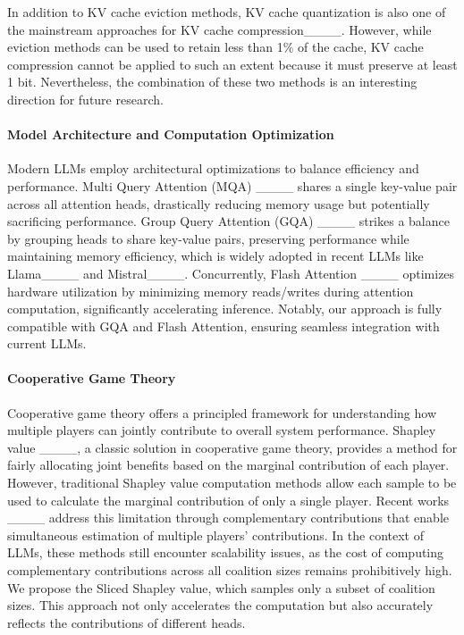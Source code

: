 In addition to KV cache eviction methods, KV cache quantization is also one of the mainstream approaches for KV cache compression____. However, while eviction methods can be used to retain less than 1\% of the cache, KV cache compression cannot be applied to such an extent because it must preserve at least 1 bit. Nevertheless, the combination of these two methods is an interesting direction for future research.

\paragraph{Model Architecture and Computation Optimization}
Modern LLMs employ architectural optimizations to balance efficiency and performance. Multi Query Attention (MQA) ____ shares a single key-value pair across all attention heads, drastically reducing memory usage but potentially sacrificing performance. Group Query Attention (GQA) ____ strikes a balance by grouping heads to share key-value pairs, preserving performance while maintaining memory efficiency, which is widely adopted in recent LLMs like Llama____ and Mistral____. Concurrently, Flash Attention ____ optimizes hardware utilization by minimizing memory reads/writes during attention computation, significantly accelerating inference. Notably, our approach is fully compatible with GQA and Flash Attention, ensuring seamless integration with current LLMs.

\paragraph{Cooperative Game Theory } Cooperative game theory offers a principled framework for understanding how multiple players can jointly contribute to overall system performance. Shapley value ____, a classic solution in cooperative game theory, provides a method for fairly allocating joint benefits based on the marginal contribution of each player. However, traditional Shapley value computation methods allow each sample to be used to calculate the marginal contribution of only a single player.
Recent works ____ address this limitation through complementary contributions that enable simultaneous estimation of multiple players' contributions. In the context of LLMs, these methods still encounter scalability issues, as the cost of computing complementary contributions across all coalition sizes remains prohibitively high.
We propose the Sliced Shapley value, which samples only a subset of coalition sizes. This approach not only accelerates the computation but also accurately reflects the contributions of different heads.